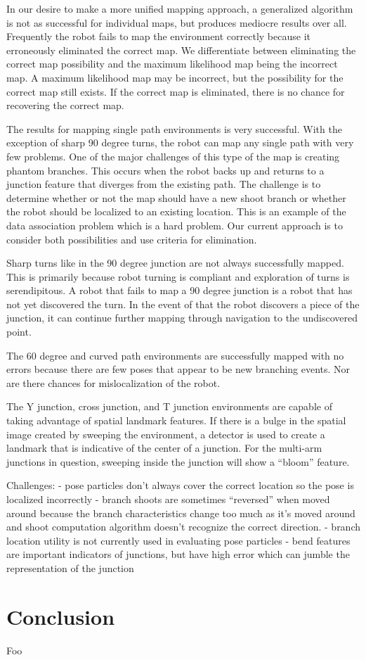 In our desire to make a more unified mapping approach, a generalized algorithm is not as successful for individual maps, but produces mediocre results over all. Frequently the robot fails to map the environment correctly because it erroneously eliminated the correct map. We differentiate between eliminating the correct map possibility and the maximum likelihood map being the incorrect map. A maximum likelihood map may be incorrect, but the possibility for the correct map still exists. If the correct map is eliminated, there is no chance for recovering the correct map.

The results for mapping single path environments is very successful. With the exception of sharp 90 degree turns, the robot can map any single path with very few problems. One of the major challenges of this type of the map is creating phantom branches. This occurs when the robot backs up and returns to a junction feature that diverges from the existing path. The challenge is to determine whether or not the map should have a new shoot branch or whether the robot should be localized to an existing location. This is an example of the data association problem which is a hard problem. Our current approach is to consider both possibilities and use criteria for elimination.

Sharp turns like in the 90 degree junction are not always successfully mapped. This is primarily because robot turning is compliant and exploration of turns is serendipitous. A robot that fails to map a 90 degree junction is a robot that has not yet discovered the turn. In the event of that the robot discovers a piece of the junction, it can continue further mapping through navigation to the undiscovered point.

The 60 degree and curved path environments are successfully mapped with no errors because there are few poses that appear to be new branching events. Nor are there chances for mislocalization of the robot.

The Y junction, cross junction, and T junction environments are capable of taking advantage of spatial landmark features. If there is a bulge in the spatial image created by sweeping the environment, a detector is used to create a landmark that is indicative of the center of a junction. For the multi-arm junctions in question, sweeping inside the junction will show a ``bloom'' feature. 

Challenges:
- pose particles don't always cover the correct location so the pose is localized incorrectly
- branch shoots are sometimes ``reversed'' when moved around because the branch characteristics change too much as it's moved around and shoot computation algorithm doesn't recognize the correct direction.
- branch location utility is not currently used in evaluating pose particles
- bend features are important indicators of junctions, but have high error which can jumble the representation of the junction

\pagebreak 

\section{Conclusion}
\label{conclusion}

Foo




